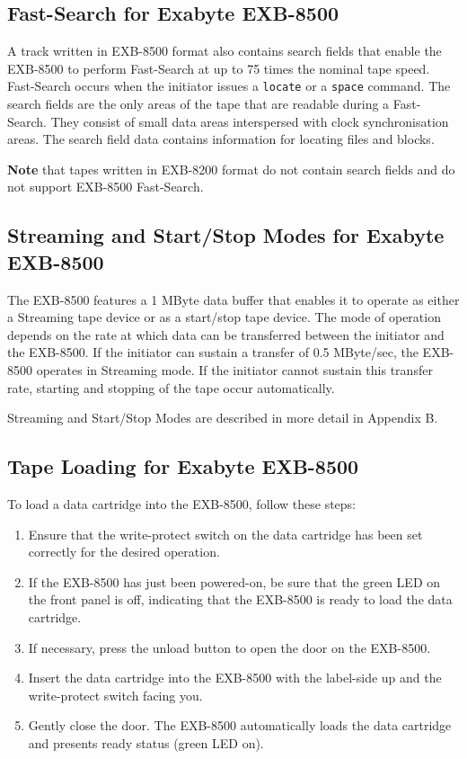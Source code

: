 \subsection {Fast-Search for Exabyte EXB-8500}

A track written in EXB-8500 format also contains search fields that enable
the EXB-8500 to perform Fast-Search at up to 75 times the nominal tape speed.
Fast-Search occurs when the initiator issues a {\tt locate} or a {\tt space}
command. The search fields are the only areas of the tape that are readable
during a Fast-Search. They consist of small data areas interspersed with clock
synchronisation areas. The search field data contains information for
locating files and blocks.

{\bf Note} that tapes written in EXB-8200 format do not contain search fields
and do not support EXB-8500 Fast-Search.

\subsection {Streaming and Start/Stop Modes for Exabyte EXB-8500}

The EXB-8500 features a 1 MByte data buffer that enables it to operate as
either a Streaming tape device or as a start/stop tape device. The mode of
operation depends on the rate at which data can be transferred between the
initiator and the EXB-8500. If the initiator can sustain a transfer of 0.5
MByte/sec, the EXB-8500 operates in Streaming mode. If the initiator cannot
sustain this transfer rate, starting and stopping of the tape occur
automatically.

Streaming and Start/Stop Modes are described in more detail in Appendix B.

\subsection {Tape Loading for Exabyte EXB-8500}

To load a data cartridge into the EXB-8500, follow these steps:

\begin {enumerate}

\item Ensure that the write-protect switch on the data cartridge has been
set correctly for the desired operation.

\item If the EXB-8500 has just been powered-on, be sure that the green LED
on the front panel is off, indicating that the EXB-8500 is ready to load the
data cartridge.

\item If necessary, press the unload button to open the door on the EXB-8500.

\item Insert the data cartridge into the EXB-8500 with the label-side up and
the write-protect switch facing you.

\item Gently close the door. The EXB-8500 automatically loads the data
cartridge and presents ready status (green LED on).

\end {enumerate}

